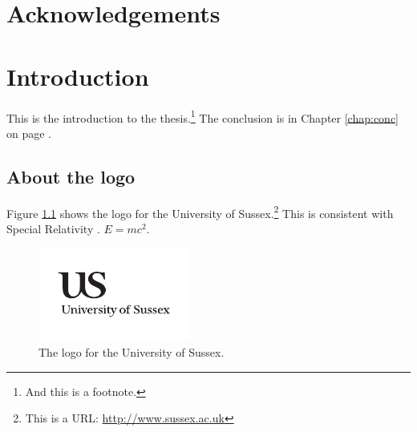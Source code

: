 \documentclass[a4paper,11pt]{report}
\newcommand{\linespacing}{1.5}
\renewcommand{\baselinestretch}{\linespacing}
\begin{document}


\chapter*{Acknowledgements}
\renewcommand{\baselinestretch}{\linespacing}
\small\normalsize



\newpage
{}
\tableofcontents
\listoftables
{}
{}
\listoffigures
{}
{}


\newpage
{}




% 

\chapter{Introduction}
\label{chap:intro}



This is the introduction to the thesis.\footnote{And this is a footnote.}  The conclusion is in Chapter \ref{chap:conc} on page \pageref{chap:conc}.

\section{About the logo}

Figure \ref{us_figure} shows the logo for the University of Sussex.\footnote{This is a URL: \url{http://www.sussex.ac.uk}} This is consistent with Special Relativity \citep{Einstein1905}. $E=mc^2$.

\begin{figure}
\centering
\includegraphics[width=5cm]{fig/uslogo.pdf}
\caption[US Logo (optional short caption)]{\label{us_figure} The logo for the University of Sussex.}
\end{figure}
\end{document}
